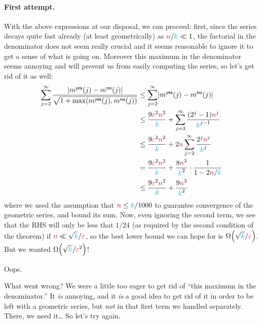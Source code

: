 \paragraph{First attempt.} With the above expressions at our disposal, we can proceed: first, since the series decays quite fast already (at least geometrically) as ${\textcolor{purple}{n}}/{\textcolor{cyan}{k}} \ll 1$, the factorial in the denominator does not seem really crucial and it seems reasonable to ignore it to get a sense of what is going on. Moreover this maximum in the denominator seems annoying and will prevent us from easily computing the series, so let's get rid of it as well:
\begin{align*}
\sum_{j=2}^\infty \frac{\abs{m^{\yes}(j)-m^{\no}(j)}}{\sqrt{1+\max(m^{\yes}(j),m^{\no}(j))}}
&\leq
\sum_{j=2}^\infty \abs{m^{\yes}(j)-m^{\no}(j)} \\
&\leq \frac{9\dst^2\ns^2}{\ab} + \sum_{j=3}^\infty \frac{(2^j-1)\ns^j}{\ab^{j-1}} \\
&\leq \frac{9\dst^2\ns^2}{\ab} + 2\ns\sum_{j=2}^\infty \frac{2^j\ns^j}{\ab^{j}} \\
&= \frac{9\dst^2\ns^2}{\ab} + \frac{8\ns^3}{\ab^2}\cdot \frac{1}{1-2\ns/\ab} \\
&\leq \frac{9\dst^2\ns^2}{\ab} + \frac{9\ns^3}{\ab^2}
\end{align*}
where we used the assumption that ${\textcolor{purple}{n}}\leq {\textcolor{cyan}{k}}/1000$ to guarantee convergence of the geometric series, and bound its sum. Now, even ignoring the second term, we see that the RHS will only be less that $1/24$ (as required by the second condition of the theorem) if ${\textcolor{purple}{n}} \ll \sqrt{{\textcolor{cyan}{k}}}/\textcolor{red}{\varepsilon}$, so the best lower bound we can hope for is $\bigOmega{\sqrt{\ab}/\dst}$. But we wanted $\bigOmega{\sqrt{\ab}/\dst^2}$!\smallskip

\noindent Oops.\smallskip

\noindent What went wrong? We were a little too eager to get rid of ``this maximum in the denominator.'' It \emph{is} annoying, and it \emph{is} a good idea to get rid of it in order to be left with a geometric series, but \emph{not} in that first term we handled separately. There, we need it\dots{} So let's try again.

